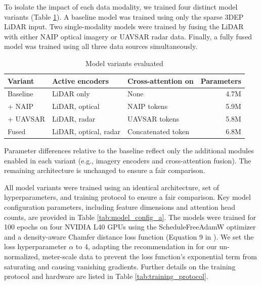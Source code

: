 \documentclass[12pt]{report}
\begin{document}
To isolate the impact of each data modality, we trained four distinct model variants (Table \ref{tab:model_variants}). A baseline model was trained using only the sparse 3DEP LiDAR input. Two single-modality models were trained by fusing the LiDAR with either NAIP optical imagery or UAVSAR radar data. Finally, a fully fused model was trained using all three data sources simultaneously.
\begin{table}[htbp]
  \centering
  \begin{threeparttable}
  \caption{Model variants evaluated}
  \label{tab:model_variants}
  \begin{tabular}{lllr}
  \toprule
  \textbf{Variant} & \textbf{Active encoders} & \textbf{Cross-attention on} & \textbf{Parameters} \\
  \midrule
 Baseline & LiDAR only & None  & 4.7M \\
  + NAIP & LiDAR, optical  & NAIP tokens & 5.9M \\
  + UAVSAR & LiDAR, radar & UAVSAR tokens  & 5.8M \\
  Fused  & LiDAR, optical, radar & Concatenated token  & 6.8M \\
  \bottomrule
  \end{tabular}
  \begin{tablenotes}
  \footnotesize
  \item Parameter differences relative to the baseline reflect only the additional modules enabled in each variant (e.g., imagery encoders and cross-attention fusion). The remaining architecture is unchanged to ensure a fair comparison.
  \end{tablenotes}
  \end{threeparttable}
\end{table}


\vspace{-3pt}
All model variants were trained using an identical architecture, set of hyperparameters, and training protocol to ensure a fair comparison. Key model configuration parameters, including feature dimensions and attention head counts, are provided in Table \ref{tab:model_config_a}. The models were trained for 100 epochs on four NVIDIA L40 GPUs using the ScheduleFreeAdamW optimizer \cite{defazio_road_2024} and a density-aware Chamfer distance loss function (Equation 9 in \cite{wu_density-aware_2021}). We set the loss hyperparameter $\alpha$ to 4, adapting the recommendation in \cite{wu_density-aware_2021} for our un-normalized, meter-scale data to prevent the loss function's exponential term from saturating and causing vanishing gradients. Further details on the training protocol and hardware are listed in Table \ref{tab:training_protocol}.
\end{document}
